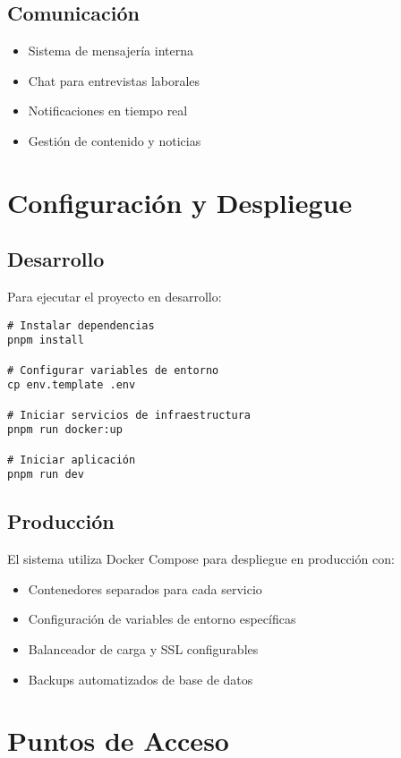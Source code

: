 \documentclass[12pt,a4paper]{article}
\begin{document}
\subsection{Comunicación}

\begin{itemize}
    \item Sistema de mensajería interna
    \item Chat para entrevistas laborales
    \item Notificaciones en tiempo real
    \item Gestión de contenido y noticias
\end{itemize}

\section{Configuración y Despliegue}

\subsection{Desarrollo}

Para ejecutar el proyecto en desarrollo:

\begin{verbatim}
# Instalar dependencias
pnpm install

# Configurar variables de entorno
cp env.template .env

# Iniciar servicios de infraestructura
pnpm run docker:up

# Iniciar aplicación
pnpm run dev
\end{verbatim}

\subsection{Producción}

El sistema utiliza Docker Compose para despliegue en producción con:

\begin{itemize}
    \item Contenedores separados para cada servicio
    \item Configuración de variables de entorno específicas
    \item Balanceador de carga y SSL configurables
    \item Backups automatizados de base de datos
\end{itemize}

\section{Puntos de Acceso}
\end{document}
